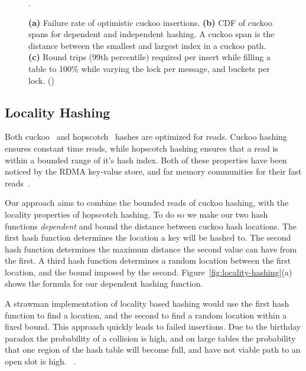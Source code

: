 \begin{figure}[t]
\begin{subfigure}{0.3\linewidth}
        \label{fig:tbd}
    \end{subfigure}.
    \vspace{-1em}
    \caption{
    \textbf{(a)} Failure rate of optimistic cuckoo insertions.
    \textbf{(b)} CDF of cuckoo spans for dependent and independent hashing. A cuckoo span is the distance between the smallest and largest index in a cuckoo path.
    \textbf{(c)} Round trips (99th percentile) required per insert while filling a table to 100\% while varying the lock per message, and buckets per lock. ()
    }
    \label{fig:cuckoo-problems}

\end{figure}


\subsection{Locality Hashing}
Both cuckoo~\cite{cuckoo} and hopscotch~\cite{hopscotch}
hashes are optimized for reads. Cuckoo hashing ensures
constant time reads, while hopscotch hashing ensures that a
read is within a bounded range of it's hash index. Both of
these properties have been noticed by the RDMA key-value
store, and far memory communities for their fast
reads~\cite{memc3,cuckoo-improvements,pilaf,farm}.

Our approach aims to combine the bounded reads of cuckoo
hashing, with the locality properties of hopscotch hashing.
To do so we make our two hash functions \textit{dependent}
and bound the distance between cuckoo hash locations.  The
first hash function determines the location a key will be
hashed to. The second hash function determines the maximum
distance the second value can have from the first. A third
hash function determines a random location between the first
location, and the bound imposed by the second.
Figure~\ref{fig:locality-hashing}(a) shows the formula for
our dependent hashing function.

A strawman implementation of locality based hashing would
use the first hash function to find a location, and the
second to find a random location within a fixed bound. This
approach quickly leads to failed insertions. Due to the
birthday paradox the probability of a collision is high, and
on large tables the probability that one region of the hash
table will become full, and have not viable path to an open
slot is high. ~.

